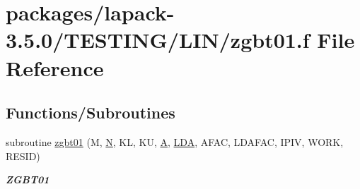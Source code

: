 \hypertarget{zgbt01_8f}{}\section{packages/lapack-\/3.5.0/\+T\+E\+S\+T\+I\+N\+G/\+L\+I\+N/zgbt01.f File Reference}
\label{zgbt01_8f}
\subsection*{Functions/\+Subroutines}
\begin{DoxyCompactItemize}
\item 
subroutine \hyperlink{group__complex16__lin_ga0126a2ab78162cd15e37a138892af0c2}{zgbt01} (M, \hyperlink{polmisc_8c_a0240ac851181b84ac374872dc5434ee4}{N}, K\+L, K\+U, \hyperlink{classA}{A}, \hyperlink{example__user_8c_ae946da542ce0db94dced19b2ecefd1aa}{L\+D\+A}, A\+F\+A\+C, L\+D\+A\+F\+A\+C, I\+P\+I\+V, W\+O\+R\+K, R\+E\+S\+I\+D)
\begin{DoxyCompactList}\small\item\em {\bfseries Z\+G\+B\+T01} \end{DoxyCompactList}\end{DoxyCompactItemize}
